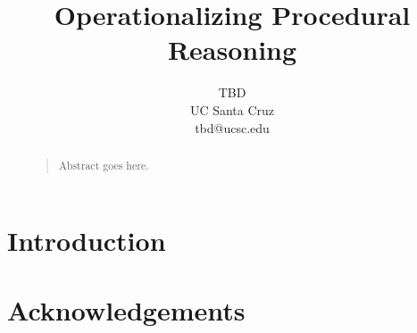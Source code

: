 \documentclass[letterpaper]{article}
\begin{document}
%
\title{Operationalizing Procedural Reasoning}
\author{
  TBD\\
  UC Santa Cruz\\
  tbd@ucsc.edu
}
\maketitle
\begin{abstract}
\begin{quote}

Abstract goes here.

\end{quote}
\end{abstract}

\section{Introduction}


\section{Acknowledgements}



\end{document}

